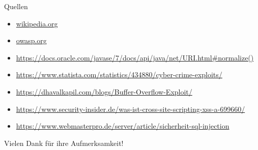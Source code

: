 \documentclass[10pt]{beamer}
\begin{document}





\begin{frame}[fragile]{Quellen}
  \begin{itemize}
    \item \url{wikipedia.org}
    \item \url{owasp.org}
    \item \url{https://docs.oracle.com/javase/7/docs/api/java/net/URI.html#normalize()}
    \item \url{https://www.statista.com/statistics/434880/cyber-crime-exploits/}
    \item \url{https://dhavalkapil.com/blogs/Buffer-Overflow-Exploit/}
    \item \url{https://www.security-insider.de/was-ist-cross-site-scripting-xss-a-699660/}
    \item \url{https://www.webmasterpro.de/server/article/sicherheit-sql-injection}
  \end{itemize}
\end{frame}

\begin{frame}[fragile]{}
  \huge Vielen Dank f\"ur ihre Aufmerksamkeit!
\end{frame}
\end{document}
